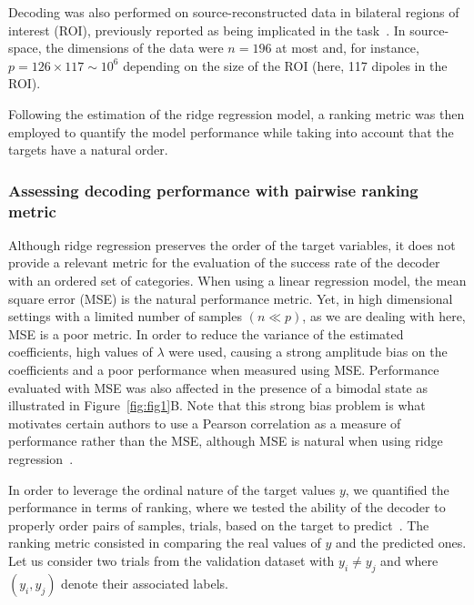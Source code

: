Decoding was also performed on source-reconstructed data in bilateral regions of interest (ROI), previously reported as being implicated in the task~\cite{23zilber2014supramodal}. In source-space, the dimensions of the data were $n=196$ at most and, for instance, $p=126\times 117 \sim 10^6$ depending on the size of the ROI (here, 117 dipoles in the ROI).

Following the estimation of the ridge regression model, a ranking metric was then employed to quantify the model performance while taking into account that the targets have a natural order.

\subsubsection*{Assessing decoding performance with pairwise ranking metric}
Although ridge regression preserves the order of the target variables, it does not provide a relevant metric for the evaluation of the success rate of the decoder with an ordered set of categories. When using a linear regression model, the mean square error (MSE) is the natural performance metric. Yet, in high dimensional settings with a limited number of samples $(n\ll p)$, as we are dealing with here, MSE is a poor metric. In order to reduce the variance of the estimated coefficients, high values of $\lambda$ were used, causing a strong amplitude bias on the coefficients and a poor performance when measured using MSE. Performance evaluated with MSE was also affected in the presence of a bimodal state as illustrated in Figure~\ref{fig:fig1}B. Note that this strong bias problem is what motivates certain authors to use a Pearson correlation as a measure of performance rather than the MSE, although MSE is natural when using ridge regression~\cite{kay2008}.

In order to leverage the ordinal nature of the target values $y$, we quantified the performance in terms of ranking, where we tested the ability of the decoder to properly order pairs of samples, trials, based on the target to predict~\cite{herbrich00ordinal,Joachims:2002}. The ranking metric consisted in comparing the real values of $y$ and the predicted ones.
Let us consider two trials from the validation dataset with $y_i \neq y_j$ and where $(y_i, y_j)$ denote their associated labels.

